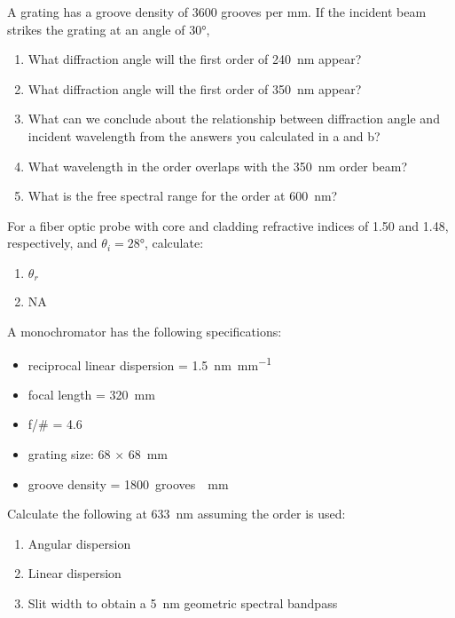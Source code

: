 \documentclass{hw}
\begin{document}
\problem{}
    A grating has a groove density of \num{3600} grooves per \si{\milli\meter}. If the incident beam strikes the grating at an angle of \ang{30},
    \begin{enumerate}
        \item What diffraction angle will the first order of \SI{240}{\nano\meter} appear?
        \item What diffraction angle will the first order of \SI{350}{\nano\meter} appear?
        \item What can we conclude about the relationship between diffraction angle and incident wavelength from the answers you calculated in a and b?
        \item What wavelength in the  order overlaps with the \SI{350}{\nano\meter}  order beam?
        \item What is the free spectral range for the  order at \SI{600}{\nano\meter}?
    \end{enumerate}
\solution

\problem{}
    For a fiber optic probe with core and cladding refractive indices of \num{1.50} and \num{1.48}, respectively, and $\theta_i = \ang{28}$, calculate:
    \begin{enumerate}
        \item $\theta_r$
        \item NA
    \end{enumerate}
\solution

\problem{}
    A monochromator has the following specifications:
    \begin{itemize}
        \item reciprocal linear dispersion = \SI{1.5}{\nano\meter\per\milli\meter}
        \item focal length = \SI{320}{\milli\meter}
        \item f/\# = \num{4.6}
        \item grating size: \num{68} $\times$ \SI{68}{\milli\meter}
        \item groove density = \SI{1800}{grooves \per\milli\meter}
    \end{itemize}
    Calculate the following at \SI{633}{\nano\meter} assuming the  order is used:
    \begin{enumerate}
        \item Angular dispersion
        \item Linear dispersion
        \item Slit width to obtain a \SI{5}{\nano\meter} geometric spectral bandpass
    \end{enumerate}
\solution
\end{document}
